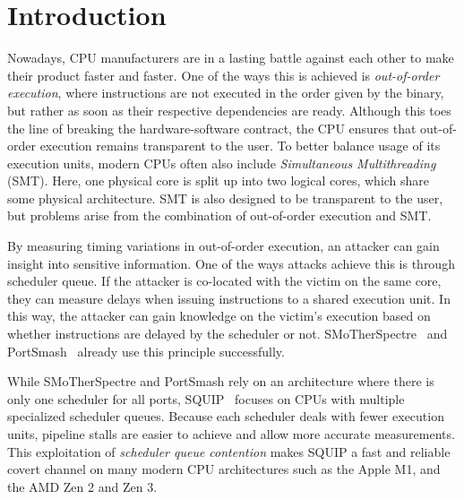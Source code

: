 \documentclass[11pt,
  titlepage=false,
]{scrreprt}
\begin{document}
\clearpage



\chapter{Introduction}
\label{ch:introduction}

Nowadays, CPU manufacturers are in a lasting battle against each other to make their product faster and faster.
One of the ways this is achieved is \textit{out-of-order execution}, where instructions are not executed in the order given by the binary, but rather as soon as their respective dependencies are ready.
Although this toes the line of breaking the hardware-software contract, the CPU ensures that out-of-order execution remains transparent to the user.
To better balance usage of its execution units, modern CPUs often also include \textit{Simultaneous Multithreading} (SMT).
Here, one physical core is split up into two logical cores, which share some physical architecture.
SMT is also designed to be transparent to the user, but problems arise from the combination of out-of-order execution and SMT.

By measuring timing variations in out-of-order execution, an attacker can gain insight into sensitive information.
One of the ways attacks achieve this is through scheduler queue.
If the attacker is co-located with the victim on the same core, they can measure delays when issuing instructions to a shared execution unit.
In this way, the attacker can gain knowledge on the victim's execution based on whether instructions are delayed by the scheduler or not.
SMoTherSpectre~\cite{Bhattacharyya2019} and PortSmash~\cite{Aldaya2019port} already use this principle successfully.

While SMoTherSpectre and PortSmash rely on an architecture where there is only one scheduler for all ports, SQUIP~\cite{squip} focuses on CPUs with multiple specialized scheduler queues.
Because each scheduler deals with fewer execution units, pipeline stalls are easier to achieve and allow more accurate measurements.
This exploitation of \textit{scheduler queue contention} makes SQUIP a fast and reliable covert channel on many modern CPU architectures such as the Apple M1, and the AMD Zen 2 and Zen 3.
\end{document}
